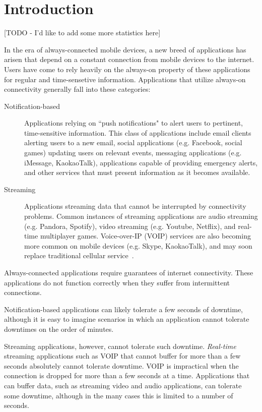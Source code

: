 \section{Introduction}
\label{sec:intro}

[TODO - I'd like to add some more statistics here]

In the era of always-connected mobile devices, a new breed of applications has arisen that depend on a constant connection from mobile devices to the internet. Users have come to rely heavily on the always-on property of these applications for regular and time-sensetive information. Applications that utilize always-on connectivity generally fall into these categories:

\begin{description}
\item[Notification-based] Applications relying on ``push notifications" to alert users to pertinent, time-sensitive information. This class of applications include email clients alerting users to a new email, social applications (e.g. Facebook, social games) updating users on relevant events, messaging applications (e.g. iMessage, KaokaoTalk), applications capable of providing emergency alerts, and other services that must present information as it becomes available.
\item[Streaming] Applications streaming data that cannot be interrupted by connectivity problems. Common instances of streaming applications are audio streaming (e.g. Pandora, Spotify), video streaming (e.g. Youtube, Netflix), and real-time multiplayer games. Voice-over-IP (VOIP) services are also becoming more common on mobile devices (e.g. Skype, KaokaoTalk), and may soon replace traditional cellular service~\cite{cellPlans}.
\end{description}

Always-connected applications require guarantees of internet connectivity. These applications do not function correctly when they suffer from intermittent connections.

Notification-based applications can likely tolerate a few seconds of downtime, although it is easy to imagine scenarios in which an application cannot tolerate downtimes on the order of minutes.

Streaming applications, however, cannot tolerate such downtime. \emph{Real-time} streaming applications such as VOIP that cannot buffer for more than a few seconds absolutely cannot tolerate downtime. VOIP is impractical when the connection is dropped for more than a few seconds at a time. Applications that can buffer data, such as streaming video and audio applications, can tolerate some downtime, although in the many cases this is limited to a number of seconds.

